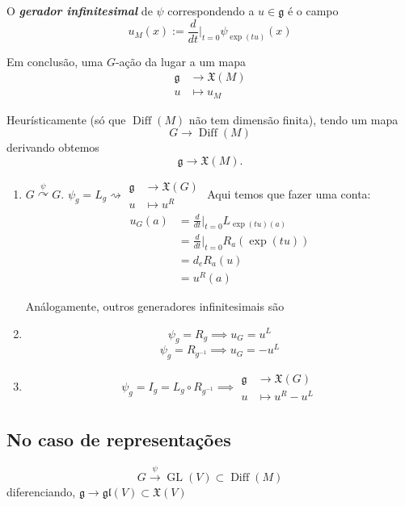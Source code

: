 \begin{example}
\begin{defn}
	O \textbf{\textit{gerador infinitesimal} }  de $\psi$ correspondendo a $u\in\mathfrak{g}$ é o campo
	\[u_M(x):=\frac{d}{dt}\Big|_{t=0}\psi_{\operatorname{exp}(tu)}(x)\]
\end{defn}
Em conclusão, uma $G$-ação da lugar a um mapa
\begin{align*}
	\mathfrak{g}  &\longrightarrow \mathfrak{X}(M) \\
	u &\longmapsto u_{M}
\end{align*}

Heurísticamente (só que $\operatorname{Diff}(M)$ não tem dimensão finita), tendo um mapa
\[G\to \operatorname{Diff}(M)\]
derivando obtemos
\[\mathfrak{g} \to \mathfrak{X}(M).\]

\begin{example}\leavevmode 
	\begin{enumerate}
		\item $G\overset{\psi}{\curvearrowright }G$. $\psi_g=L_g\rightsquigarrow \begin{aligned}
			\mathfrak{g}  &\longrightarrow \mathfrak{X}(G) \\
			u &\longmapsto u^R
		\end{aligned}$
	Aqui temos que fazer uma conta:
	\begin{align*}
		u_G(a)&=\frac{d}{dt}\Big|_{t=0}L_{\operatorname{exp}(tu)(a)}\\
		&=\frac{d}{dt}\Big|_{t=0}R_a(\operatorname{exp}(tu))\\
		 &=d_eR_a(u)\\
		 &=u^R(a)
	\end{align*}

	Análogamente,  outros generadores infinitesimais são

\item \[\psi_g=R_g\implies u_G=u^L\]
	\[\psi_g=R_{g ^{-1}}\implies u_G=-u^L\]
\item \[\psi_g=I_g=L_g\circ R_{g ^{-1}}\implies \begin{aligned}
	\mathfrak{g} &\longrightarrow \mathfrak{X}(G) \\
	u &\longmapsto u^R-u^L
\end{aligned} \]
	\end{enumerate}
\end{example}

\subsection{No caso de representações}
\[G \overset{\psi}{\longrightarrow}\operatorname{GL}(V)\subset \operatorname{Diff}(M)\]
diferenciando,
$\mathfrak{g} \longrightarrow \mathfrak{gl}(V) \subset \mathfrak{X}(V)$ 


\end{example}
